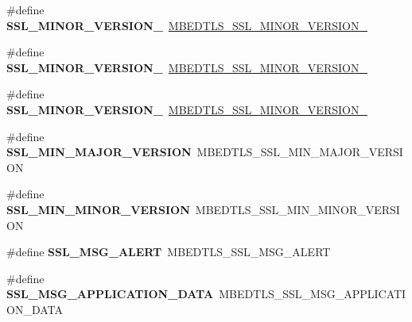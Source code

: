 \begin{DoxyCompactItemize}
\item 
\mbox{\label{compat-1_83_8h_a3e0c978697874bb5457d61f7515e8f55}} 
\#define {\bfseries S\+S\+L\+\_\+\+M\+I\+N\+O\+R\+\_\+\+V\+E\+R\+S\+I\+O\+N\+\_}~\mbox{\hyperlink{ssl_8h_a364e4bfbd4f909a2aa7ac5eb31c6b1b2}{M\+B\+E\+D\+T\+L\+S\+\_\+\+S\+S\+L\+\_\+\+M\+I\+N\+O\+R\+\_\+\+V\+E\+R\+S\+I\+O\+N\+\_}}
\item 
\mbox{\label{compat-1_83_8h_aab565447d7abe2dcb01544e7dbfcd4c9}} 
\#define {\bfseries S\+S\+L\+\_\+\+M\+I\+N\+O\+R\+\_\+\+V\+E\+R\+S\+I\+O\+N\+\_}~\mbox{\hyperlink{ssl_8h_a9fe59361b834e334b80efacb10f8e33a}{M\+B\+E\+D\+T\+L\+S\+\_\+\+S\+S\+L\+\_\+\+M\+I\+N\+O\+R\+\_\+\+V\+E\+R\+S\+I\+O\+N\+\_}}
\item 
\mbox{\label{compat-1_83_8h_a6d963f23682491708743fd3de381cc1d}} 
\#define {\bfseries S\+S\+L\+\_\+\+M\+I\+N\+O\+R\+\_\+\+V\+E\+R\+S\+I\+O\+N\+\_}~\mbox{\hyperlink{ssl_8h_a3c5a90b4b4aded2190f31f7d4c670cb4}{M\+B\+E\+D\+T\+L\+S\+\_\+\+S\+S\+L\+\_\+\+M\+I\+N\+O\+R\+\_\+\+V\+E\+R\+S\+I\+O\+N\+\_}}
\item 
\mbox{\label{compat-1_83_8h_a8480d96b4e54df5a6a7a31e38edc35c2}} 
\#define {\bfseries S\+S\+L\+\_\+\+M\+I\+N\+\_\+\+M\+A\+J\+O\+R\+\_\+\+V\+E\+R\+S\+I\+ON}~M\+B\+E\+D\+T\+L\+S\+\_\+\+S\+S\+L\+\_\+\+M\+I\+N\+\_\+\+M\+A\+J\+O\+R\+\_\+\+V\+E\+R\+S\+I\+ON
\item 
\mbox{\label{compat-1_83_8h_a9505bd0c270200150a26b6d85afc0934}} 
\#define {\bfseries S\+S\+L\+\_\+\+M\+I\+N\+\_\+\+M\+I\+N\+O\+R\+\_\+\+V\+E\+R\+S\+I\+ON}~M\+B\+E\+D\+T\+L\+S\+\_\+\+S\+S\+L\+\_\+\+M\+I\+N\+\_\+\+M\+I\+N\+O\+R\+\_\+\+V\+E\+R\+S\+I\+ON
\item 
\mbox{\label{compat-1_83_8h_a3d6dc94916f324f0a42881bd6e6f7db6}} 
\#define {\bfseries S\+S\+L\+\_\+\+M\+S\+G\+\_\+\+A\+L\+E\+RT}~M\+B\+E\+D\+T\+L\+S\+\_\+\+S\+S\+L\+\_\+\+M\+S\+G\+\_\+\+A\+L\+E\+RT
\item 
\mbox{\label{compat-1_83_8h_a6ea7789fe625447a1bf69d9a2382c861}} 
\#define {\bfseries S\+S\+L\+\_\+\+M\+S\+G\+\_\+\+A\+P\+P\+L\+I\+C\+A\+T\+I\+O\+N\+\_\+\+D\+A\+TA}~M\+B\+E\+D\+T\+L\+S\+\_\+\+S\+S\+L\+\_\+\+M\+S\+G\+\_\+\+A\+P\+P\+L\+I\+C\+A\+T\+I\+O\+N\+\_\+\+D\+A\+TA

\end{DoxyCompactItemize}
